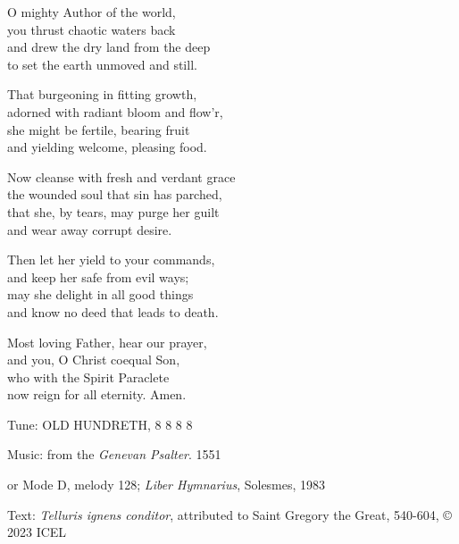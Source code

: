 \hymn

\begin{hymnverse}
O mighty Author of the world,\\
you thrust chaotic waters back\\
and drew the dry land from the deep\\
to set the earth unmoved and still.

That burgeoning in fitting growth,\\
adorned with radiant bloom and flow’r,\\
she might be fertile, bearing fruit\\
and yielding welcome, pleasing food.

Now cleanse with fresh and verdant grace\\
the wounded soul that sin has parched,\\
that she, by tears, may purge her guilt\\
and wear away corrupt desire.

Then let her yield to your commands,\\
and keep her safe from evil ways;\\
may she delight in all good things\\
and know no deed that leads to death.

Most loving Father, hear our prayer,\\
and you, O Christ coequal Son,\\
who with the Spirit Paraclete\\
now reign for all eternity. Amen.
\end{hymnverse}

\begin{hymnsource}
Tune: OLD HUNDRETH, 8 8 8 8

Music: from the \emph{Genevan Psalter}. 1551

or Mode D, melody 128; \emph{Liber Hymnarius}, Solesmes, 1983

Text: \emph{Telluris ignens conditor}, attributed to Saint Gregory the Great, 540-604, © 2023 ICEL
\end{hymnsource}